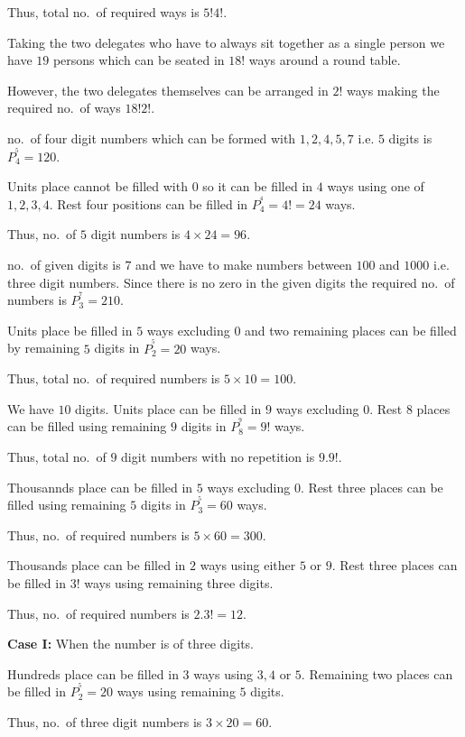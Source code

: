   Thus, total no.\ of required ways is $5!4!$.
\item Taking the two delegates who have to always sit together as a single person we have $19$ persons
  which can be seated in $18!$ ways around a round table.

  However, the two delegates themselves can be arranged in $2!$ ways making the required no.\ of ways
  $18!2!$.
\item no.\ of four digit numbers which can be formed with $1, 2, 4, 5, 7$ i.e. $5$ digits is $P_4^^5 = 120$.
\item Units place cannot be filled with $0$ so it can be filled in $4$ ways using one of $1, 2, 3, 4$. Rest
  four positions can be filled in $P_4^^4 = 4! = 24$ ways.

  Thus, no.\ of $5$ digit numbers is $4\times24 = 96$.
\item no.\ of given digits is $7$ and we have to make numbers between $100$ and $1000$ i.e. three digit
  numbers. Since there is no zero in the given digits the required no.\ of numbers is $P_3^^7 = 210$.
\item Units place be filled in $5$ ways excluding $0$ and two remaining places can be filled by remaining
  $5$ digits in $P_2^^5 = 20$ ways.

  Thus, total no.\ of required numbers is $5\times10 = 100$.
\item We have $10$ digits. Units place can be filled in $9$ ways excluding $0$. Rest $8$ places can be
  filled using remaining $9$ digits in $P_8^^9 = 9!$ ways.

  Thus, total no.\ of $9$ digit numbers with no repetition is $9.9!$.
\item Thousannds place can be filled in $5$ ways excluding $0$. Rest three places can be filled using
  remaining $5$ digits in $P_3^^5 = 60$ ways.

  Thus, no.\ of required numbers is $5\times60 = 300$.
\item Thousands place can be filled in $2$ ways using either $5$ or $9$. Rest three places can be filled in
  $3!$ ways using remaining three digits.

  Thus, no.\ of required numbers is $2.3! = 12$.
\item {\bf Case I:} When the number is of three digits.

  Hundreds place can be filled in $3$ ways using $3, 4$ or $5$. Remaining two places can be filled in
  $P_2^^5 = 20$ ways using remaining $5$ digits.

  Thus, no.\ of three digit numbers is $3\times20 = 60$.


